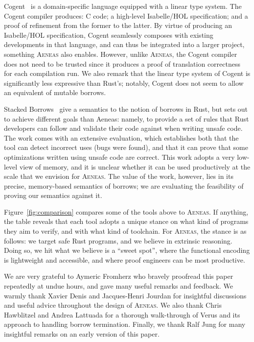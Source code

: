 \documentclass[acmsmall,screen]{acmart}
\newcommand{\fref}[1]{Figure~\ref{fig:#1}}
\newcommand{\aeneas}{\textsc{Aeneas}\xspace}
\begin{document}
Cogent~\cite{cogent,cogentold} is a domain-specific language equipped with a linear type
system. The Cogent compiler produces: C code; a high-level Isabelle/HOL
specification; and a proof of refinement from the former to the latter.
By virtue of producing an Isabelle/HOL specification, Cogent seamlessly composes
with existing developments in that language, and can thus be integrated into a
larger project, something \aeneas also enables. However, unlike \aeneas, the
Cogent compiler does not need to be trusted since it produces a proof of
translation correctness for each compilation run. We also remark that the linear
type system of Cogent is significantly less expressive than Rust's; notably,
Cogent does not seem to allow an equivalent of mutable borrows.

Stacked Borrows~\cite{jung2019stacked} give a semantics to the notion of borrows
in Rust, but sets out to achieve different goals than Aeneas: namely, to provide
a set of rules that Rust developers can follow and validate their code against
when writing unsafe code. The work comes with an extensive evaluation, which
establishes both that the tool can detect incorrect uses (bugs were found), and
that it can prove that some optimizations written using unsafe code are correct.
This work adopts a very low-level view of memory, and it is unclear whether it
can be used productively at the scale that we envision for \aeneas. The value of
the work, however, lies in its precise, memory-based semantics of borrows; we
are evaluating the feasibility of proving our semantics against it.



\fref{comparison} compares some of the tools above to \aeneas.
If anything, the table reveals that each tool adopts a unique stance on what
kind of programs they aim to verify, and with what kind of toolchain. For \aeneas,
the stance is as follows: we target safe Rust programs, and we believe in
extrinsic reasoning. Doing so, we hit what we believe is a ``sweet spot'', where
the functional encoding is lightweight and accessible, and where proof engineers
can be most productive.





\begin{acks}
  We are very grateful to Aymeric Fromherz who bravely proofread this paper
  repeatedly at undue hours, and gave many useful remarks and feedback.
  We warmly thank Xavier Denis and Jacques-Henri Jourdan for insightful
  discussions and useful advice throughout the design of \aeneas.
  We also thank Chris Hawblitzel and Andrea Lattuada for a thorough walk-through
  of Verus and its approach to handling borrow termination. Finally, we thank Ralf
  Jung for many insightful remarks on an early version of this paper.
\end{acks}




\end{document}
